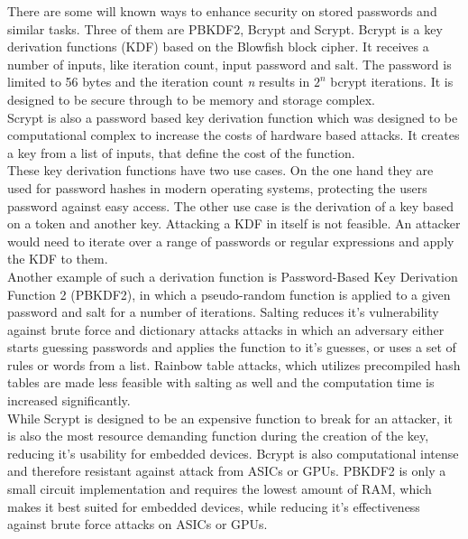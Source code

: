         There are some will known ways to enhance security on stored passwords and similar tasks. Three of them are PBKDF2\cite{kaliski_pkcs_2000}, Bcrypt\cite{provos_future-adaptable_1999} and Scrypt\cite{josefsson_scrypt_2016}.
        Bcrypt is a key derivation functions (KDF) based on the Blowfish block cipher. It receives a number of inputs, like iteration count, input password and salt. The password is limited to 56 bytes and the iteration count \textit{n} results in $2^n$ bcrypt iterations. It is designed to be secure through to be memory and storage complex\cite{hatzivasilis_password_2015-1}\cite{provos_future-adaptable_1999}.\\
        Scrypt is also a password based key derivation function which was designed to be computational complex to increase the costs of hardware based attacks. It creates a key from a list of inputs, that define the cost of the function.\\
        These key derivation functions have two use cases. On the one hand they are used for password hashes in modern operating systems, protecting the users password against easy access\cite{percival_stronger_nodate}. 
        The other use case is the derivation of a key based on a token and another key\cite{camenisch_privacy_2011}. Attacking a KDF in itself is not feasible. An attacker would need to iterate over a range of passwords or regular expressions and apply the KDF to them\cite{percival_stronger_nodate}.\\
        Another example of such a derivation function is Password-Based Key Derivation Function 2 (PBKDF2), in which a pseudo-random function is applied to a given password and salt for a number of iterations. 
        Salting reduces it's vulnerability against brute force and dictionary attacks attacks in which an adversary either starts guessing passwords and applies the function to it's guesses, or uses a set of rules or words from a list. Rainbow table attacks, which utilizes precompiled hash tables are made less feasible with salting as well and the computation time is increased significantly\cite{kaliski_bkaliskirsasecuritycom_pkcs_2000}. \\
        While Scrypt is designed to be an expensive function to break for an attacker, it is also the most resource demanding function during the creation of the key, reducing it's usability for embedded devices. Bcrypt is also computational intense and therefore resistant against attack from ASICs or GPUs. PBKDF2 is only a small circuit implementation and requires the lowest amount of RAM, which makes it best suited for embedded devices, while reducing it's effectiveness against brute force attacks on ASICs or GPUs\cite{hatzivasilis_password_2015-1}.\\

